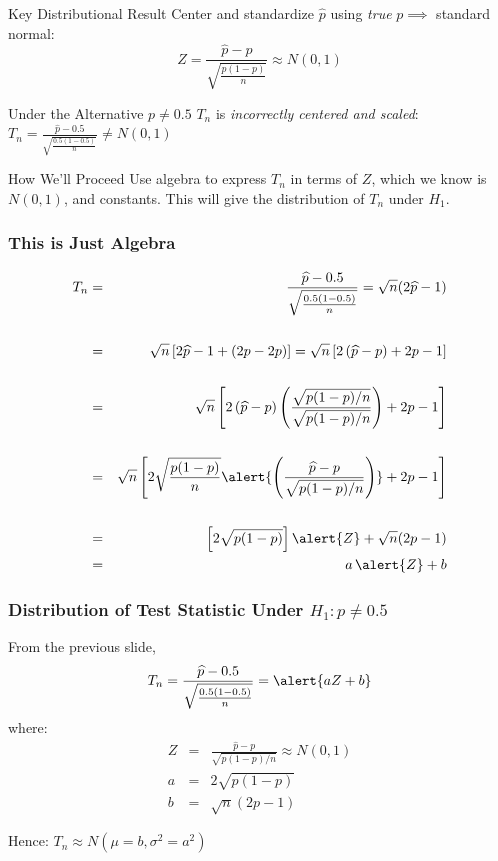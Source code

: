 \documentclass[handout]{beamer}
\begin{document}
\begin{frame}

\begin{block}
	{Key Distributional Result}
	Center and standardize $\widehat{p}$ using \emph{true} $p \implies$ standard normal:
	$$Z = \frac{\widehat{p} - p}{\sqrt{\frac{p(1-p)}{n}}}  \approx N(0,1)$$
\end{block}

\begin{block}
	{Under the Alternative $p\neq 0.5$}
	$T_n$ is \emph{incorrectly centered and scaled}: $\displaystyle T_n = \frac{\widehat{p} - 0.5}{\sqrt{\frac{0.5(1-0.5)}{n}}} \neq N(0,1)$
\end{block}

\begin{alertblock}
	{How We'll Proceed}
	Use algebra to express $T_n$ in terms of $Z$, which we know is $N(0,1)$, and constants. This will give the distribution of $T_n$ under $H_1$.
\end{alertblock}
\end{frame}
\begin{frame}
\frametitle{This is Just Algebra}
\small
	\begin{eqnarray*}
	T_n &=&\frac{\widehat{p} - 0.5}{\sqrt{\frac{0.5(1-0.5)}{n}}} =\sqrt{n}(2\widehat{p} - 1)\\ \\
	&=& \sqrt{n} \left[2\widehat{p} -1 + (2p -2p)\right] = \sqrt{n}\left[ 2\left(\widehat{p} - p\right) + 2p -1\right]\\ \\
	&=& \sqrt{n}\left[ 2\left(\widehat{p} - p\right) \left(\frac{\sqrt{p(1-p)/n}}{\sqrt{p(1-p)/n}}\right) + 2p -1\right]\\ \\
		&=& \sqrt{n}\left[ 2\sqrt{\frac{p(1-p)}{n}} \alert{\left(\frac{\widehat{p} - p}{\sqrt{p(1-p)/n}}\right)} + 2p -1\right]\\ \\
		&=& \left[2\sqrt{p(1-p)}\right] \alert{Z} + \sqrt{n}(2p -1)\\
		&=& a\, \alert{Z} + b
\end{eqnarray*}
\end{frame}
\begin{frame}
\frametitle{Distribution of Test Statistic Under $H_1\colon p \neq 0.5$ }

From the previous slide,
	$$T_n =\frac{\widehat{p} - 0.5}{\sqrt{\frac{0.5(1-0.5)}{n}}} = \alert{a Z + b}$$
where:
	\begin{eqnarray*}
		Z &=& \frac{\widehat{p} - p}{\sqrt{p(1-p)/n}} \approx N(0,1)\\ 
		a &=& 2\sqrt{p(1-p)}\\ 
		b &=& \sqrt{n}(2p -1) 
	\end{eqnarray*}

\vspace{1em}
\alert{Hence: $T_n \approx N(\mu = b, \sigma^2 = a^2)$}
\end{frame}
\end{document}
